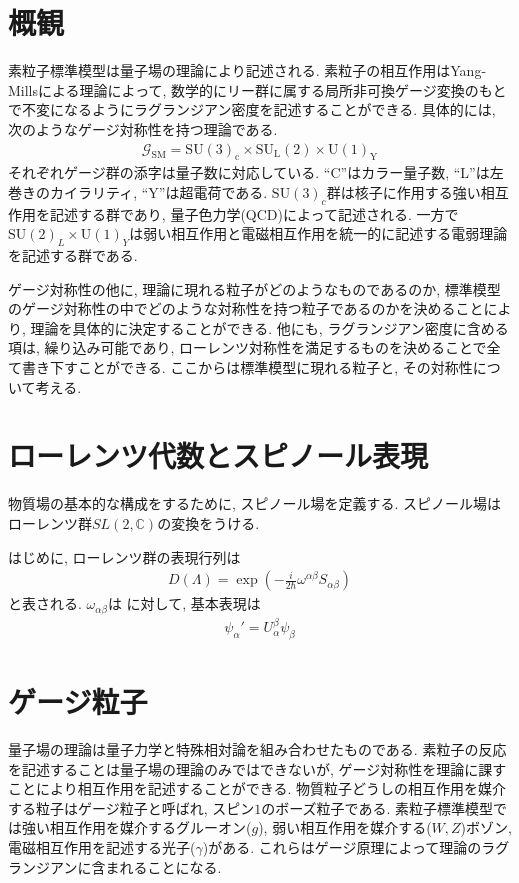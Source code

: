 \documentclass[uplatex,dvipdfmx,a4paper,titlepage]{jsbook}
\theoremstyle{plain}
\theoremstyle{definition}
\begin{document}
\section{概観}
素粒子標準模型は量子場の理論により記述される.
素粒子の相互作用はYang-Millsによる理論によって, 数学的にリー群に属する局所非可換ゲージ変換のもとで不変になるようにラグランジアン密度を記述することができる.
具体的には, 次のようなゲージ対称性を持つ理論である.
\begin{align}
  \mathcal{G}_{\text{SM}}=\mathrm{SU}(3)_\mathrm{c}\times \mathrm{SU}_\mathrm{L}(2)\times \mathrm{U}(1)_\mathrm{Y}\label{SM-Gauge}
\end{align}
それぞれゲージ群の添字は量子数に対応している.
``C''はカラー量子数, ``L''は左巻きのカイラリティ, ``Y''は超電荷である.
$\mathrm{SU}(3)_c$群は核子に作用する強い相互作用を記述する群であり, 量子色力学(QCD)によって記述される.
一方で$\mathrm{SU}(2)_L\times \mathrm{U}(1)_Y$は弱い相互作用と電磁相互作用を統一的に記述する電弱理論を記述する群である.

ゲージ対称性の他に, 理論に現れる粒子がどのようなものであるのか, 標準模型のゲージ対称性の中でどのような対称性を持つ粒子であるのかを決めることにより, 理論を具体的に決定することができる.
他にも, ラグランジアン密度に含める項は, 繰り込み可能であり, ローレンツ対称性を満足するものを決めることで全て書き下すことができる.
ここからは標準模型に現れる粒子と, その対称性について考える.
\section{ローレンツ代数とスピノール表現}
物質場の基本的な構成をするために, スピノール場を定義する.
スピノール場はローレンツ群$SL(2,\mathbb{C})$の変換をうける.

はじめに, ローレンツ群の表現行列は
\begin{eqnarray}
  D(\Lambda) = \exp\left(-\frac{i}{2\hbar}\omega^{\alpha\beta}S_{\alpha\beta}\right)
\end{eqnarray}
と表される.
$\omega_{\alpha\beta}$は
に対して, 基本表現は
\begin{eqnarray}
  \psi_\alpha' = U_\alpha^\beta \psi_\beta\label{spi_1}
\end{eqnarray}

\section{ゲージ粒子}
量子場の理論は量子力学と特殊相対論を組み合わせたものである.
素粒子の反応を記述することは量子場の理論のみではできないが, ゲージ対称性を理論に課すことにより相互作用を記述することができる.
物質粒子どうしの相互作用を媒介する粒子はゲージ粒子と呼ばれ, スピン$1$のボーズ粒子である.
素粒子標準模型では強い相互作用を媒介するグルーオン($g$), 弱い相互作用を媒介する($W, Z$)ボゾン, 電磁相互作用を記述する光子($\gamma$)がある.
これらはゲージ原理によって理論のラグランジアンに含まれることになる.
\end{document}
